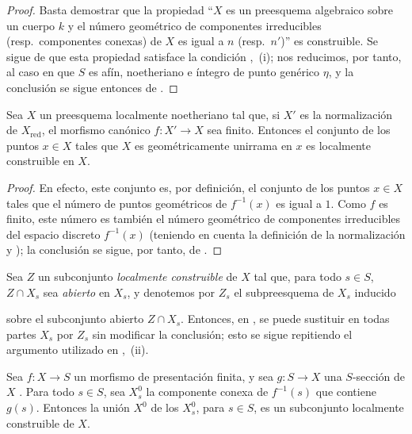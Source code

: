 \begin{proof}
Basta demostrar que la propiedad ``$X$ es un preesquema algebraico sobre un cuerpo $k$ y el número geométrico de componentes irreducibles (resp.\ componentes conexas) de $X$ es igual a $n$ (resp.\ $n'$)'' es construible. Se sigue de  que esta propiedad satisface la condición ,~(i); nos reducimos, por tanto, al caso en que $S$ es afín, noetheriano e íntegro de punto genérico $\eta$, y la conclusión se sigue entonces de .
\end{proof}

\begin{corollary}[9.7.10]
\label{IV.9.7.10}
Sea $X$ un preesquema localmente noetheriano tal que, si $X'$ es la normalización de $X_{\mathrm{red}}$, el morfismo canónico $f:X'\to X$ sea finito. Entonces el conjunto de los puntos $x\in X$ tales que $X$ es geométricamente unirrama en $x$ es localmente construible en $X$.
\end{corollary}

\begin{proof}
En efecto, este conjunto es, por definición, el conjunto de los puntos $x\in X$ tales que el número de puntos geométricos de $f^{-1}(x)$ es igual a $1$. Como $f$ es finito, este número es también el número geométrico de componentes irreducibles del espacio discreto $f^{-1}(x)$ (teniendo en cuenta la definición de la normalización  y ); la conclusión se sigue, por tanto, de .
\end{proof}

\begin{remark}[9.7.11]
\label{IV.9.7.11}
Sea $Z$ un subconjunto \emph{localmente construible} de $X$ tal que, para todo $s\in S$, $Z\cap X_s$ sea \emph{abierto} en $X_s$, y denotemos por $Z_s$ el subpreesquema de $X_s$ inducido


sobre el subconjunto abierto $Z\cap X_s$. Entonces, en , se puede sustituir en todas partes $X_s$ por $Z_s$ sin modificar la conclusión; esto se sigue repitiendo el argumento utilizado en ,~(ii).
\end{remark}

\begin{proposition}[9.7.12]
\label{IV.9.7.12}
Sea $f:X\to S$ un morfismo de presentación finita, y sea $g:S\to X$ una $S$-sección de $X$ . Para todo $s\in S$, sea $X_s^0$ la componente conexa de $f^{-1}(s)$ que contiene $g(s)$. Entonces la unión $X^0$ de los $X_s^0$, para $s\in S$, es un subconjunto localmente construible de $X$.
\end{proposition}

